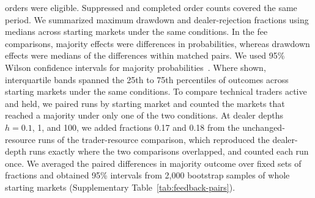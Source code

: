 orders were eligible. Suppressed and completed order counts covered the
same period. We summarized maximum drawdown and dealer-rejection fractions
using medians across starting markets under the same conditions. In the
fee comparisons, majority effects were differences in probabilities,
whereas drawdown effects were medians of the differences within matched
pairs. We used 95\% Wilson
confidence intervals for majority probabilities~\cite{wilson1927probable}.
Where shown, interquartile bands spanned the 25th to 75th percentiles of
outcomes across starting markets under the same conditions.
To compare technical traders active and held, we paired runs by starting
market and counted the markets that reached a majority under only one
of the two conditions. At dealer depths $h=0.1$, 1, and 100, we added
fractions 0.17 and 0.18 from the unchanged-resource runs of the
trader-resource comparison, which reproduced the dealer-depth runs
exactly where the two comparisons overlapped, and counted each run once.
We averaged the paired differences in majority outcome over fixed sets
of fractions and obtained 95\% intervals from 2,000 bootstrap samples
of whole starting markets (Supplementary Table~\ref{tab:feedback-pairs}).

